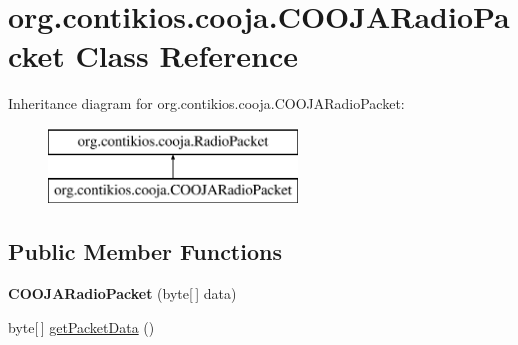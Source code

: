 \hypertarget{classorg_1_1contikios_1_1cooja_1_1COOJARadioPacket}{\section{org.\-contikios.\-cooja.\-C\-O\-O\-J\-A\-Radio\-Packet Class Reference}
\label{classorg_1_1contikios_1_1cooja_1_1COOJARadioPacket}
}
Inheritance diagram for org.\-contikios.\-cooja.\-C\-O\-O\-J\-A\-Radio\-Packet\-:\begin{figure}[H]
\begin{center}
\leavevmode
\includegraphics[height=2.000000cm]{classorg_1_1contikios_1_1cooja_1_1COOJARadioPacket}
\end{center}
\end{figure}
\subsection*{Public Member Functions}
\begin{DoxyCompactItemize}
\item 
\hypertarget{classorg_1_1contikios_1_1cooja_1_1COOJARadioPacket_ac6dd4fed045f653fbe99c9ece7f17ff3}{{\bfseries C\-O\-O\-J\-A\-Radio\-Packet} (byte\mbox{[}$\,$\mbox{]} data)}\label{classorg_1_1contikios_1_1cooja_1_1COOJARadioPacket_ac6dd4fed045f653fbe99c9ece7f17ff3}

\item 
byte\mbox{[}$\,$\mbox{]} \hyperlink{classorg_1_1contikios_1_1cooja_1_1COOJARadioPacket_a9322f1664dc941ebe8880a6530e526ff}{get\-Packet\-Data} ()
\end{DoxyCompactItemize}


